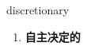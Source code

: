 
\begin{frame}
{\huge discretionary}
\begin{center}
\begin{enumerate}\Large
  \item \textbf{自主决定的}
\end{enumerate}
\end{center}
\end{frame}
